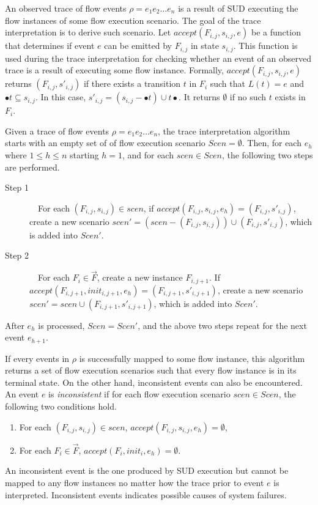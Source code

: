 \documentclass[conference]{IEEEtran}
\begin{document}
An observed trace of flow events $\rho = e_1e_2\ldots e_n$ is a result of SUD executing the flow instances of some flow execution scenario.  The goal of the trace interpretation is to derive such scenario.  Let $\mathit{accept(F_{i,j}, s_{i,j}, e)}$ be a function that determines if event $e$ can be emitted by $F_{i,j}$ in state $s_{i,j}$.  This function is used during the trace interpretation for checking whether an event of an observed trace is a result of executing some flow instance.  Formally,  $\mathit{accept(F_{i,j}, s_{i,j}, e)}$ returns $(F_{i,j}, s'_{i,j})$ if there exists a transition $t$ in $F_i$ such that $L(t) = e$ and $\bullet t \subseteq s_{i,j}$.  In this case, $s'_{i,j} = (s_{i,j} - \bullet t) \cup t\bullet$.  It returns $\emptyset$ if no such $t$ exists in $F_i$. 

Given a trace of flow events $\rho = e_1e_2\ldots e_n$, the trace interpretation algorithm starts with an empty set of of flow execution scenario $\mathit{Scen} = \emptyset$.  Then, for each $e_h$ where $1 \leq h \leq n$ starting $h=1$, and for each $\mathit{scen} \in \mathit{Scen}$, the following two steps are performed. 
\begin{description}
\item[Step 1]~~For each $(F_{i,j}, s_{i,j}) \in \mathit{scen}$, if $\mathit{accept}(F_{i,j}, s_{i,j}, e_h) = (F_{i,j}, s'_{i,j})$, create a new scenario $\mathit{scen}' = (\mathit{scen} - (F_{i,j}, s_{i,j})) \cup (F_{i,j}, s'_{i,j})$, which is added into $\mathit{Scen}'$.

\item[Step 2]~~For each $F_i \in \vec{F}$, create a new instance $F_{i, j+1}$.  If $\mathit{accept}(F_{i,j+1}, \mathit{init}_{i,j+1}, e_h) = (F_{i,j+1}, s'_{i,j+1})$,  create a new scenario $\mathit{scen}' = \mathit{scen} \cup (F_{i,j+1}, s'_{i,j+1})$, which is added into $\mathit{Scen}'$.
\end{description}
After $e_h$ is processed, $Scen = Scen'$, and the above two steps repeat for the next event $e_{h+1}$.

If every events in $\rho$ is successfully mapped to some flow instance, this algorithm returns a set of flow execution scenarios such that every flow instance is in its terminal state.  On the other hand, inconsistent events can also be encountered.  An event $e$ is \emph{inconsistent} if for each flow execution scenario $\mathit{scen} \in \mathit{Scen}$, the following two conditions hold.
\begin{enumerate}
\item For each $(F_{i,j}, s_{i,j}) \in \mathit{scen}$, $\mathit{accept}(F_{i,j}, s_{i,j}, e_h) = \emptyset$,
\item For each $F_i \in \vec{F}$, $\mathit{accept}(F_{i}, \mathit{init}_{i}, e_h) = \emptyset$.
\end{enumerate}
An inconsistent event is the one produced by SUD execution but cannot be mapped to any flow instances no matter how the trace prior to event $e$ is interpreted.  Inconsistent events indicates possible causes of system failures.     
\end{document}
